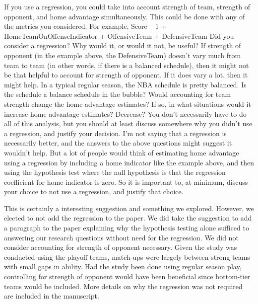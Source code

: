 \documentclass[12pt]{article}
\newenvironment{comment}%
{\begin{quoting}\noindent\small\it\ignorespaces%
  }{\end{quoting}}
\begin{document}
 
\begin{comment}
If you use a regression, you could take into account strength of team,
strength of opponent, and home advantage simultaneously. This could 
be done with any of the metrics you considered. For example,
Score ~ 1 + HomeTeamOnOffenseIndicator + OffensiveTeam + DefensiveTeam
Did you consider a regression? Why would it, or would it not, be useful? 
If strength of opponent (in the example above, the DefensiveTeam) doesn’t
vary much from team to team (in other words, if there is a
balanced schedule), then it might not be that helpful to account for 
strength of opponent. If it does vary a lot, then it might help.
In a typical regular season, the NBA schedule is pretty balanced. 
Is the schedule a balance schedule in the bubble?
Would accounting for team strength change the home advantage estimates? If so, 
in what situations would it increase home advantage estimates? Decrease?
You don’t necessarily have to do all of this analysis, but you should at least 
discuss somewhere why you didn’t use a regression, and justify your decision.
I’m not saying that a regression is necessarily better, and the answers to 
the above questions might suggest it wouldn’t help. But a lot of people
would think of estimating home advantage using a regression by including a home 
indicator like the example above, and then using the hypothesis test where 
the null hypothesis is that the regression coefficient for home indicator
is zero. So it is important to, at minimum, discuss your choice to not use
a regression, and justify that
choice.
\end{comment}

 This is certainly a interesting suggestion and something we explored. However, we 
 elected to not add the regression to the paper. We did take the suggestion to add
 a paragraph to the paper explaining why the hypothesis testing alone sufficed to
 answering our research questions without need for the regression. We did not
 consider accounting for strength of opponent necessary. Given the study was 
 conducted using the playoff teams, match-ups were largely between strong teams 
 with small gaps in ability. Had the study been done using regular season play, 
 controlling for strength of opponent would have been beneficial since bottom-tier 
 teams would be included. More details on why the regression was not required are 
 included in the manuscript.
\end{document}
